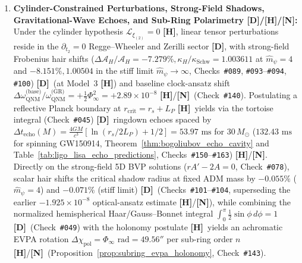 \documentclass[11pt,a4paper]{article}
\newcommand{\catD}{\textbf{\textcolor{blue!75!black}{[D]}}}
\newcommand{\catH}{\textbf{\textcolor{orange!85!black}{[H]}}}
\newcommand{\catN}{\textbf{\textcolor{teal!75!black}{[N]}}}
\theoremstyle{plain}
\theoremstyle{definition}
\theoremstyle{remark}
\numberwithin{equation}{section}
\begin{document}
\begin{enumerate}
    \item \textbf{Cylinder-Constrained Perturbations, Strong-Field Shadows, Gravitational-Wave Echoes, and Sub-Ring Polarimetry \catD/\catH/\catN:} Under the cylinder hypothesis $\mathcal{L}_{\xi_{(2)}} = 0$ \catH, linear tensor perturbations reside in the $\partial_{t_2} = 0$ Regge--Wheeler and Zerilli sector \catD, with strong-field Frobenius hair shifts ($\Delta\mathcal{A}_H/\mathcal{A}_H = -7.279\%, \kappa_H/\kappa_{\text{Schw}} = 1.003611$ at $\hat{m}_{\psi} = 4$ and $\mathbf{-8.151\%}, \mathbf{1.00504}$ in the stiff limit $\hat{m}_{\psi} \to \infty$, Checks~\texttt{\#089}, \texttt{\#093}--\texttt{\#094}, \texttt{\#100}) \catD\ (at Model~3 \catH) and baseline clock-ansatz shift $\Delta\omega_{\text{QNM}}^{\text{(base)}}/\omega_{\text{QNM}}^{\text{(GR)}} = +\frac{1}{2}\Phi_{\infty}^2 = +2.89 \times 10^{-8}$ \catH/\catN\ (Check~\texttt{\#140}). Postulating a reflective Planck boundary at $r_{\text{crit}} = r_s + L_P$ \catH\ yields via the tortoise integral (Check~\texttt{\#045}) \catD\ ringdown echoes spaced by $\Delta t_{\text{echo}}(M) = \frac{4GM}{c^3}[\ln(r_s/2L_P) + 1/2] = 53.97\text{ ms}$ for $30\,M_\odot$ ($132.43\text{ ms}$ for spinning GW150914, Theorem~\ref{thm:bogoliubov_echo_cavity} and Table~\ref{tab:ligo_lisa_echo_predictions}, Checks~\texttt{\#150}--\texttt{\#163}) \catH/\catN. Directly on the strong-field 5D BVP solutions ($r A' - 2A = 0$, Check~\texttt{\#078}), scalar hair shifts the critical shadow radius at fixed ADM mass by $\mathbf{-0.055\%}$ ($\hat{m}_{\psi} = 4$) and $\mathbf{-0.071\%}$ (stiff limit) \catD\ (Checks~\texttt{\#101}--\texttt{\#104}, superseding the earlier $-1.925 \times 10^{-8}$ optical-ansatz estimate \catH/\catN), while combining the normalized hemispherical Haar/Gauss--Bonnet integral $\int_0^\pi \frac{1}{2}\sin\phi\,d\phi = 1$ \catD\ (Check~\texttt{\#049}) with the holonomy postulate \catH\ yields an achromatic EVPA rotation $\Delta\chi_{\text{pol}} = \Phi_{\infty}\text{ rad} = 49.56''$ per sub-ring order $n$ \catH/\catN\ (Proposition~\ref{prop:subring_evpa_holonomy}, Check~\texttt{\#143}).


\end{enumerate}
\end{document}
